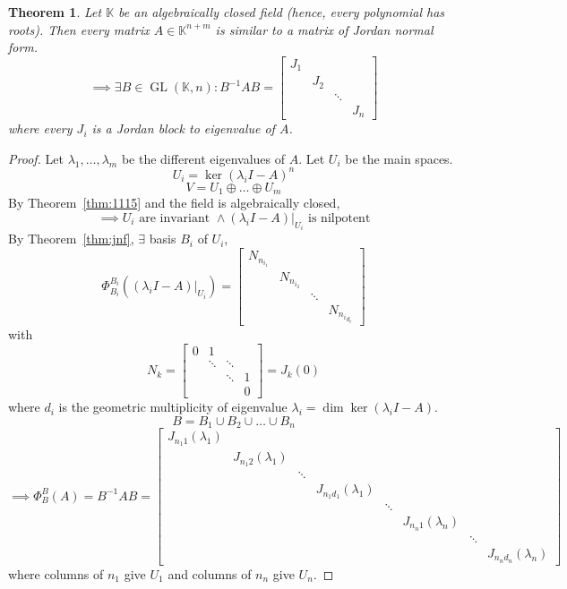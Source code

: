 \documentclass{article}
\newtheorem{theorem}{Theorem}  \numberwithin{theorem}{section}
\begin{document}
\begin{theorem} %
  Let $\mathbb K$ be an algebraically closed field (hence, every polynomial has roots).
  Then every matrix $A \in \mathbb K^{n+m}$ is similar to a matrix of Jordan normal form.
  \[
    \implies \exists B \in \operatorname{GL}(\mathbb K, n): B^{-1} AB =
    \begin{bmatrix}
      J_1 & & & \\
        & J_2 & & \\
        & & \ddots & \\
        & & & J_n
    \end{bmatrix}
  \]
  where every $J_i$ is a Jordan block to eigenvalue of $A$.
\end{theorem}

\begin{proof}
  Let $\lambda_1, \dots, \lambda_m$ be the different eigenvalues of $A$. Let $U_i$ be the main spaces. %
  \[ U_i = \ker(\lambda_i I - A)^n \]
  \[ V = U_1 \oplus \dots \oplus U_m \]
  By Theorem~\ref{thm:1115} and the field is algebraically closed,
  \[ \implies U_i \text{ are invariant } \land (\lambda_i I - A)|_{U_i} \text{ is nilpotent} \]
  By Theorem~\ref{thm:jnf}, $\exists$ basis $B_i$ of $U_i$,
  \[
    \Phi_{B_i}^{B_i}\left((\lambda_i I - A)|_{U_i}\right) = \begin{bmatrix}
      N_{n_{i_1}} & & & \\
      & N_{n_{i_2}} & & \\
      & & \ddots & \\
      & & & N_{{n_i}_{d_i}}
    \end{bmatrix}
  \]
  with
  \[ N_k = \begin{bmatrix} 0 & 1 & & \\ & \ddots & \ddots & \\ & & \ddots & 1 \\ & & & 0 \end{bmatrix} = J_k(0) \]
  where $d_i$ is the geometric multiplicity of eigenvalue $\lambda_i = \dim{\ker(\lambda_i I - A)}$.
  \[ B = B_1 \cup B_2 \cup \dots \cup B_n \]
  \[
    \implies \Phi_B^B(A) = B^{-1} AB = \begin{bmatrix}
      J_{n_{1} 1}(\lambda_1) & & & & & & & \\
      & J_{n_{1} 2}(\lambda_1) & & & & & & \\
      & & \ddots & & & & & \\
      & & & J_{n_{1} d_1}(\lambda_1) & & & & \\
      & & & & \ddots & & & \\
      & & & & & J_{n_n 1}(\lambda_n) & & \\
      & & & & & & \ddots & \\
      & & & & & & & J_{n_n d_n}(\lambda_n)
    \end{bmatrix}
  \]
  where columns of $n_1$ give $U_1$ and columns of $n_n$ give $U_n$.
\end{proof}
\end{document}
